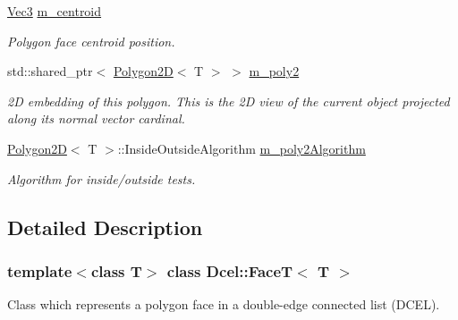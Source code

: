 \begin{DoxyCompactItemize}
\hyperlink{classDcel_1_1FaceT_ade9c182834ec6f18a0e17b8140308db2}{Vec3} \hyperlink{classDcel_1_1FaceT_a9a85e2c47be9ac4bbfe8620bc0773d6d}{m\+\_\+centroid}
\begin{DoxyCompactList}\small\item\em Polygon face centroid position. \end{DoxyCompactList}\item 
\mbox{\label{classDcel_1_1FaceT_a77edb4eca91bcd6fb47ce3574c11b840}} 
std\+::shared\+\_\+ptr$<$ \hyperlink{classDcel_1_1Polygon2D}{Polygon2D}$<$ T $>$ $>$ \hyperlink{classDcel_1_1FaceT_a77edb4eca91bcd6fb47ce3574c11b840}{m\+\_\+poly2}
\begin{DoxyCompactList}\small\item\em 2D embedding of this polygon. This is the 2D view of the current object projected along its normal vector cardinal. \end{DoxyCompactList}\item 
\mbox{\label{classDcel_1_1FaceT_acc53b6246f9d5d57777789aad6084d14}} 
\hyperlink{classDcel_1_1Polygon2D}{Polygon2D}$<$ T $>$\+::Inside\+Outside\+Algorithm \hyperlink{classDcel_1_1FaceT_acc53b6246f9d5d57777789aad6084d14}{m\+\_\+poly2\+Algorithm}
\begin{DoxyCompactList}\small\item\em Algorithm for inside/outside tests. \end{DoxyCompactList}\end{DoxyCompactItemize}


\subsection{Detailed Description}
\subsubsection*{template$<$class T$>$\newline
class Dcel\+::\+Face\+T$<$ T $>$}

Class which represents a polygon face in a double-\/edge connected list (D\+C\+EL). 

